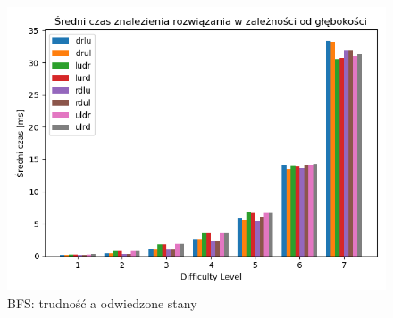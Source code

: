 \documentclass{classrep}
\begin{document}
\begin{figure}[p] \centering
 \includegraphics[width=0.9\linewidth]{./pic/bfs_time_vs_diff.png}
 \caption{BFS: trudność a odwiedzone stany}
\end{figure}
\end{document}
